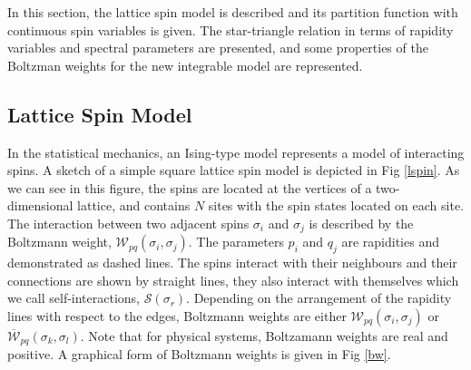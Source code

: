 \documentclass[a4paper,11pt]{article}%
\numberwithin{equation}{section}
\begin{document}
In this section, the lattice spin model is described and its partition function with continuous spin variables is given. The star-triangle relation in terms of rapidity variables and spectral parameters are presented, and some properties of the Boltzman weights for the new integrable model are represented. 



\subsection{Lattice Spin Model }
In the statistical mechanics, an Ising-type model represents a model of interacting
spins. A sketch of a simple square lattice spin model is depicted in Fig \ref{lspin}. As we can see in this figure, the spins are located at the vertices of a two-dimensional lattice, and contains $N$ sites with the spin states located on each site. The interaction between two adjacent spins $\sigma_i$ and $\sigma_j$ is described by the Boltzmann weight, $\mathcal{W}_{pq}(\sigma_i,\sigma_j)$. The parameters $p_i$ and $q_j$ are rapidities and demonstrated as dashed lines. The spins interact with their neighbours and their connections are shown by straight lines, they also interact with themselves which we call self-interactions, $\mathcal{S}(\sigma_r)$. Depending on the arrangement of the rapidity lines  with respect to the edges, Boltzmann weights are either $\mathcal{W}_{pq}(\sigma_i,\sigma_j)$ or $\overline{\mathcal{W}}_{pq}(\sigma_k,\sigma_l)$. Note that for physical systems, Boltzamann weights are real and positive. A graphical form of Boltzmann weights is given in Fig \ref{bw}. 
\end{document}
